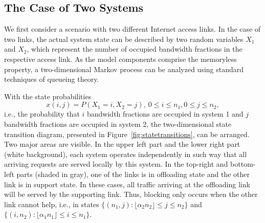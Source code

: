 


\subsection{The Case of Two Systems}\label{sec:aggregation:performance_model:analytical_model:2_systems}



We first consider a scenario with two different Internet access links. %
In the case of two links, the actual system state can be described by two random variables $X_1$ and $X_2$, which represent the number of occupied bandwidth fractions in the respective access link. As the model components comprise the memoryless property, a two-dimensional Markov process can be analyzed using standard techniques of queueing theory.

With the state probabilities
\begin{equation}
x(i,j) = P(X_1=i, X_2=j),\ 0\leq i\leq n_1, 0\leq j \leq n_2,
\end{equation}
i.e., the probability that $i$ bandwidth fractions are occupied in system 1 and $j$ bandwidth fractions are occupied in system 2, the two-dimensional state transition diagram, presented in Figure~\ref{fig:statetransitions}, can be arranged. Two major areas are visible. In the upper left part and the lower right part (white background), each system operates independently in such way that all arriving requests are served locally by this system. In the top-right and bottom-left parts (shaded in gray), one of the links is in offloading state and the other link is in support state. In these cases, all traffic arriving at the offloading link will be served by the supporting link. Thus, blocking only occurs when the other link cannot help, i.e., in states $\{(n_1,j) : \lfloor\alpha_2 n_2\rfloor \leq j \leq n_2\}$ and $\{(i,n_2) : \lfloor\alpha_1 n_1\rfloor\leq i \leq n_1\}$.


